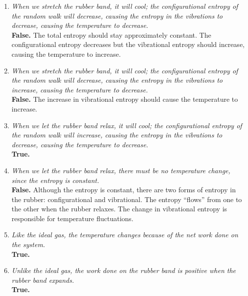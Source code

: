 \documentclass[11pt,letterpaper]{article}
\numberwithin{equation}{section}
\numberwithin{figure}{section}
\begin{document}
\begin{enumerate}

\item \textit{When we stretch the rubber band, it will cool; the configurational entropy of the random walk will decrease, causing the entropy in the vibrations to decrease, causing the temperature to decrease.}
\\
\textbf{False.} The total entropy should stay approximately constant. The configurational entropy decreases but the vibrational entropy should increase, causing the temperature to increase.

\item \textit{When we stretch the rubber band, it will cool; the configurational entropy of the random walk will decrease, causing the entropy in the vibrations to increase, causing the temperature to decrease.}
\\
\textbf{False.} The increase in vibrational entropy should cause the temperature to increase.

\item \textit{When we let the rubber band relax, it will cool; the configurational entropy of the random walk will increase, causing the entropy in the vibrations to decrease, causing the temperature to decrease.}
\\
\textbf{True.}

\item \textit{When we let the rubber band relax, there must be no temperature change, since the entropy is constant.}
\\
\textbf{False.} Although the entropy is constant, there are two forms of entropy in the rubber: configurational and vibrational. The entropy ``flows'' from one to the other when the rubber relaxes. The change in vibrational entropy is responsible for temperature fluctuations.

\item \textit{Like the ideal gas, the temperature changes because of the net work done on the system.}
\\
\textbf{True.}

\item \textit{Unlike the ideal gas, the work done on the rubber band is positive when the rubber band expands.}
\\
\textbf{True.}

\end{enumerate}
\end{document}
